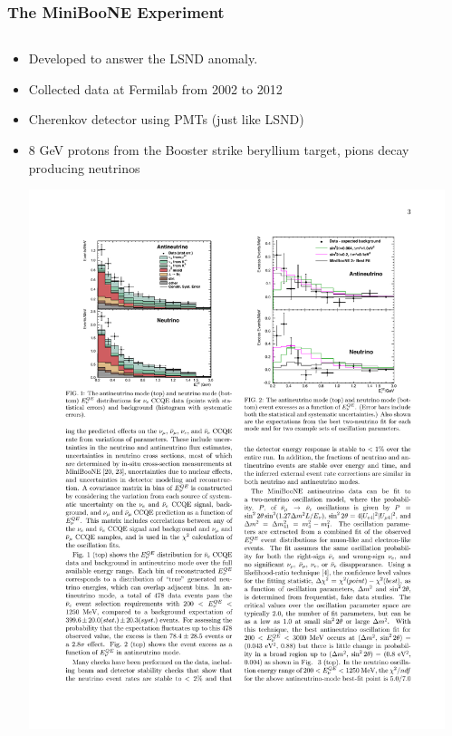 \documentclass[mathserif,18pt,xcolor=table]{beamer}
\begin{document}
\begin{frame}
  \frametitle{The MiniBooNE Experiment}
  \scriptsize{
    \begin{columns}
      \begin{column}{.5\linewidth}      
        \begin{itemize}
        \item Developed to answer the LSND anomaly.
        \item Collected data at Fermilab from 2002 to 2012
        \item Cherenkov detector using PMTs (just like LSND)
        \item 8 GeV protons from the Booster strike beryllium target, pions decay producing neutrinos
          \begin{center}
            \includegraphics[width=.9\linewidth]{../figures/miniboone_excess.pdf}
          \end{center}
        \end{itemize}
      \end{column}
      \begin{column}{.5\linewidth}
        \begin{itemize}

\end{itemize}
\end{column}
\end{columns}}
\end{frame}
\end{document}
